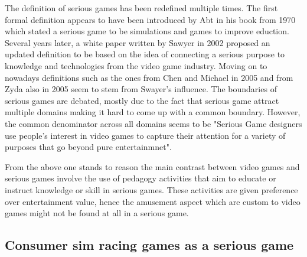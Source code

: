 \documentclass{article}
\begin{document}
The definition of serious games has been redefined multiple times. The first formal definition appears to have been introduced by Abt in his book from 1970 which stated a serious game to be simulations and games to improve eduction\cite{abt1970}. Several years later, a white paper written by Sawyer in 2002 proposed an updated definition to be based on the idea of connecting a serious purpose to knowledge and technologies from the video game industry\cite{michael2005serious}. Moving on to nowadays definitions such as the ones from Chen and Michael in 2005\cite{michael2005serious} and from Zyda also in 2005\cite{zyda2005visual} seem to stem from Swayer's influence. The boundaries of serious games are debated, mostly due to the fact that serious game attract multiple domains making it hard to come up with a common boundary. However, the common denominator across all domains seems to be "Serious Game designers use people's interest in video games to capture their attention for a variety of purposes that go beyond pure entertainmnet"\cite{djaouti2011classifying}.

From the above one stands to reason the main contrast between video games and serious games involve the use of pedagogy activities that aim to educate or instruct knowledge or skill\cite{zyda2005visual} in serious games. These activities are given preference over entertainment value, hence the amusement aspect which are custom to video games might not be found at all in a serious game\cite{zyda2005visual}. 

\subsection{Consumer sim racing games as a serious game}
\end{document}
